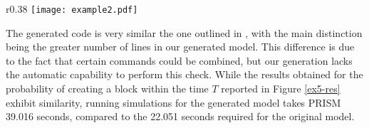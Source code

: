 \begin{comment}
   [NGRDF] (Network=0)  $\rightarrow$  
   	1 : (set2'=addBlockSet(set2,b2))$\&$(set3'=addBlockSet(set3,b3))$\&$(set4'=addBlockSet(set4,b4))$\&$(set5'=addBlockSet(set5,b5))$\&$(Network'=0); 
   [PCRLD] (Network=0)  $\rightarrow$  
   	1 : (set2'=addBlockSet(set2,b2))$\&$(set3'=addBlockSet(set3,b3))$\&$(set4'=addBlockSet(set4,b4))$\&$(set5'=addBlockSet(set5,b5))$\&$(Network'=0); 
   [MDDCF] (Network=0)  $\rightarrow$  1 : (set1' = removeBlock(set1,b1))$\&$(Network'=0); 
   [IQVPA] (Network=0)  $\rightarrow$  1 : (set1' = removeBlock(set1,b1))$\&$(Network'=0); 
   $\ldots$
endmodule

module Vote_Manager
   Vote_Manager : [0..1] init 0;
   epoch : [0..10] init 0;
   Votes : hash[];  
   tot_stake : [0..120000] init 50; 
   stake1 : [0..N] init 10; 
   stake2 : [0..N] init 10; 
   stake3 : [0..N] init 10; 
   stake4 : [0..N] init 10; 
   stake5 : [0..N] init 10; 

   [VSJBE] (Vote_Manager=0)  $\rightarrow$  
   	1 : (Votes'=addVote(Votes,b1,stake1))$\&$(Vote_Manager'=0); 
   $\ldots$
endmodule

\end{lstlisting}
\end{comment}

\begin{wrapfigure}{r}{0.38\textwidth}
	\vspace{-0.75cm}
	\centering
	\texttt{[image: example2.pdf]}	
	\vspace{-0.35cm}
	\caption{}
	\label{ex5-res}
	\vspace{-0.75cm}
	\end{wrapfigure}
        The generated code is very similar the one outlined in
        \cite{DBLP:journals/distribledger/GallettaLMV23}, with the
        main distinction being the greater number of lines in our
        generated model.  This difference is due to the fact that
        certain commands could be combined, but our generation lacks
        the automatic capability to perform this check. While the
        results obtained for the probability of creating a block within the time $T$
        reported in Figure \ref{ex5-res} exhibit similarity, running
        simulations for the generated model takes PRISM 39.016
        seconds, compared to the 22.051 seconds required for the
        original model.


